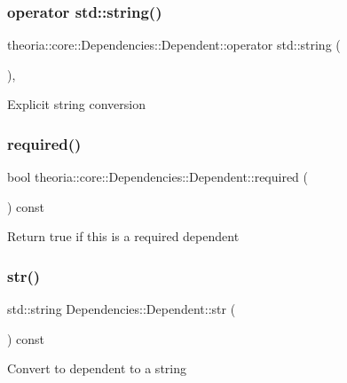 \subsubsection{\texorpdfstring{operator std\+::string()}{operator std::string()}}
{\footnotesize\ttfamily theoria\+::core\+::\+Dependencies\+::\+Dependent\+::operator std\+::string (\begin{DoxyParamCaption}{ }\end{DoxyParamCaption})\hspace{0.3cm}{\ttfamily [inline]}, {\ttfamily [explicit]}}

Explicit string conversion \mbox{\label{structtheoria_1_1core_1_1Dependencies_1_1Dependent_add9488312226f059c685e3d6f852afa9}} 
\subsubsection{\texorpdfstring{required()}{required()}}
{\footnotesize\ttfamily bool theoria\+::core\+::\+Dependencies\+::\+Dependent\+::required (\begin{DoxyParamCaption}{ }\end{DoxyParamCaption}) const\hspace{0.3cm}{\ttfamily [inline]}}

Return true if this is a required dependent \mbox{\label{structtheoria_1_1core_1_1Dependencies_1_1Dependent_abeab560057d991361b8429b7c136b345}} 
\subsubsection{\texorpdfstring{str()}{str()}}
{\footnotesize\ttfamily std\+::string Dependencies\+::\+Dependent\+::str (\begin{DoxyParamCaption}{ }\end{DoxyParamCaption}) const}

Convert to dependent to a string 

